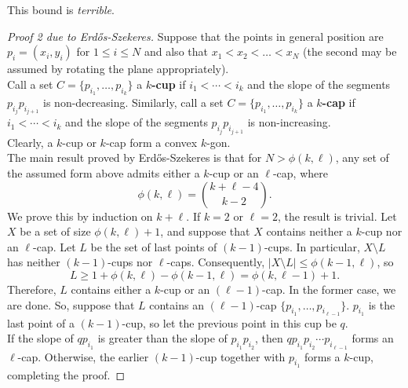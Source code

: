 	 This bound is \emph{terrible}.

	 \begin{proof}[Proof 2 due to Erd\H{o}s-Szekeres]
	 	Suppose that the points in general position are $p_i = (x_i,y_i)$ for $1\le i\le N$ and also that $x_1 < x_2 < \ldots < x_N$ (the second may be assumed by rotating the plane appropriately).\\
	 	Call a set $C = \{p_{i_1},\ldots,p_{i_k}\}$ a \textbf{$k$-cup} if $i_1 < \cdots < i_k$ and the slope of the segments $p_{i_j} p_{i_{j+1}}$ is non-decreasing. Similarly, call a set $C = \{p_{i_1},\ldots,p_{i_k}\}$ a \textbf{$k$-cap} if $i_1 < \cdots < i_k$ and the slope of the segments $p_{i_j} p_{i_{j+1}}$ is non-increasing.\\
	 	Clearly, a $k$-cup or $k$-cap form a convex $k$-gon.\\

	 	The main result proved by Erd\H{o}s-Szekeres is that for $N > \phi(k,\ell)$, any set of the assumed form above admits either a $k$-cup or an $\ell$-cap, where
	 	\[ \phi(k,\ell) = \binom{k+\ell-4}{k-2}. \]
	 	We prove this by induction on $k+\ell$. If $k=2$ or $\ell=2$, the result is trivial. Let $X$ be a set of size $\phi(k,\ell)+1$, and suppose that $X$ contains neither a $k$-cup nor an $\ell$-cap. Let $L$ be the set of last points of $(k-1)$-cups. In particular, $X \setminus L$ has neither $(k-1)$-cups nor $\ell$-caps. Consequently, $|X\setminus L| \le \phi(k-1,\ell)$, so
	 	\[ L \ge 1 + \phi(k,\ell) - \phi(k-1,\ell) = \phi(k,\ell-1) + 1. \]
	 	Therefore, $L$ contains either a $k$-cup or an $(\ell-1)$-cap. In the former case, we are done. So, suppose that $L$ contains an $(\ell-1)$-cap $\{p_{i_1},\ldots,p_{i_{\ell-1}}\}$. $p_{i_1}$ is the last point of a $(k-1)$-cup, so let the previous point in this cup be $q$.\\
	 	If the slope of $qp_{i_1}$ is greater than the slope of $p_{i_1}p_{i_2}$, then $qp_{i_1}p_{i_2}\cdots p_{i_{\ell-1}}$ forms an $\ell$-cap. Otherwise, the earlier $(k-1)$-cup together with $p_{i_1}$ forms a $k$-cup, completing the proof.
	 \end{proof}

